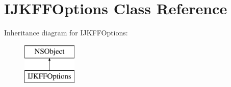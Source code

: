 \hypertarget{interface_i_j_k_f_f_options}{}\section{I\+J\+K\+F\+F\+Options Class Reference}
\label{interface_i_j_k_f_f_options}
Inheritance diagram for I\+J\+K\+F\+F\+Options\+:\begin{figure}[H]
\begin{center}
\leavevmode
\includegraphics[height=2.000000cm]{interface_i_j_k_f_f_options}
\end{center}
\end{figure}
